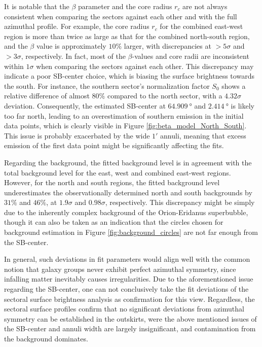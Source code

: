 It is notable that the \(\beta\) parameter and the core radius \(r_c\) are not always consistent when comparing the sectors against each other and with the full azimuthal profile. For example, the core radius \(r_c\) for the combined east-west region is more than twice as large as that for the combined north-south region, and the \(\beta\) value is approximately \(10\%\) larger, with discrepancies at \(> 5\sigma\) and \(> 3\sigma\), respectively. In fact, most of the \(\beta\)-values and core radii are inconsistent within \(1\sigma\) when comparing the sectors against each other. This discrepancy may indicate a poor SB-center choice, which is biasing the surface brightness towards the south. For instance, the southern sector's normalization factor \(S_0\) shows a relative difference of almost \(80\%\) compared to the north sector, with a \(4.32\sigma\) deviation. Consequently, the estimated SB-center at \(\SI{64.909}{\degree}\) and \(\SI{2.414}{\degree}\) is likely too far north, leading to an overestimation of southern emission in the initial data points, which is clearly visible in Figure \ref{fig:beta_model_North_South}. This issue is probably exacerbated by the wide \(1'\) annuli, meaning that excess emission of the first data point might be significantly affecting the fits. 

Regarding the background, the fitted background level is in agreement with the total background level for the east, west and combined east-west regions. However, for the north and south regions, the fitted background level underestimates the observationally determined north and south backgrounds by \(31\%\) and \(46\%\), at \(1.9\sigma\) and \(0.98\sigma\), respectively. This discrepancy might be simply due to the inherently complex background of the Orion-Eridanus superbubble, though it can also be taken as an indication that the circles chosen for background estimation in Figure \ref{fig:background_circles} are not far enough from the SB-center.

In general, such deviations in fit parameters would align well with the common notion that galaxy groups never exhibit perfect azimuthal symmetry, since infalling matter inevitably causes irregularities. Due to the aforementioned issue regarding the SB-center, one can not conclusively take the fit deviations of the sectoral surface brightness analysis as confirmation for this view. Regardless, the sectoral surface profiles confirm that no significant deviations from azimuthal symmetry can be established in the outskirts, were the above mentioned issues of the SB-center and annuli width are largely insignificant, and contamination from the background dominates.

